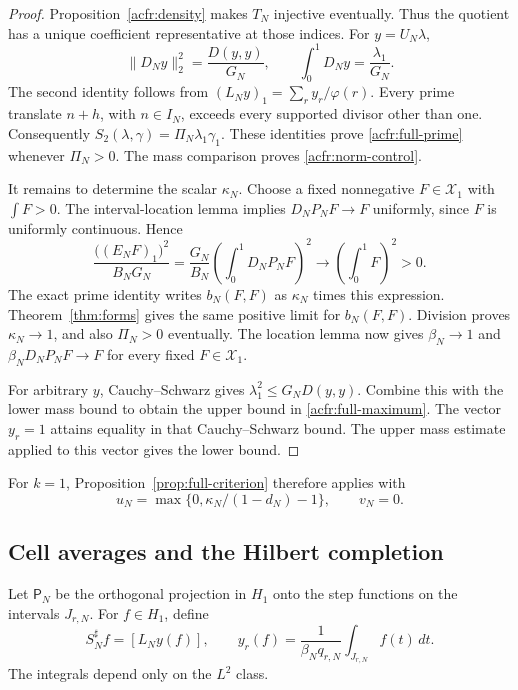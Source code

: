 \begin{proof}
Proposition~\ref{acfr:density} makes $T_N$ injective eventually.
Thus the quotient has a unique coefficient representative at those indices.
For $y=U_N\lambda$,
\[
 \|D_Ny\|_2^2=\frac{D(y,y)}{G_N},\qquad
 \int_0^1D_Ny=\frac{\lambda_1}{G_N}.
\]
The second identity follows from $(L_Ny)_1=\sum_ry_r/\varphi(r)$.
Every prime translate $n+h$, with $n\in I_N$, exceeds every supported divisor other than one.
Consequently $S_2(\lambda,\gamma)=\Pi_N\lambda_1\gamma_1$.
These identities prove \eqref{acfr:full-prime} whenever $\Pi_N>0$.
The mass comparison proves \eqref{acfr:norm-control}.

It remains to determine the scalar $\kappa_N$.
Choose a fixed nonnegative $F\in\mathcal X_1$ with $\int F>0$.
The interval-location lemma implies
$D_NP_NF\to F$ uniformly, since $F$ is uniformly continuous.
Hence
\[
 \frac{\bigl((E_NF)_1\bigr)^2}{B_NG_N}
       =\frac{G_N}{B_N}\left(\int_0^1D_NP_NF\right)^2
       \longrightarrow\left(\int_0^1F\right)^2>0.
\]
The exact prime identity writes $b_N(F,F)$ as $\kappa_N$ times this expression.
Theorem~\ref{thm:forms} gives the same positive limit for $b_N(F,F)$.
Division proves $\kappa_N\to1$, and also $\Pi_N>0$ eventually.
The location lemma now gives $\beta_N\to1$ and
$\beta_ND_NP_NF\to F$ for every fixed $F\in\mathcal X_1$.

For arbitrary $y$, Cauchy--Schwarz gives
$\lambda_1^2\leq G_ND(y,y)$.
Combine this with the lower mass bound to obtain the upper bound in
\eqref{acfr:full-maximum}.
The vector $y_r=1$ attains equality in that Cauchy--Schwarz bound.
The upper mass estimate applied to this vector gives the lower bound.
\end{proof}

For $k=1$, Proposition~\ref{prop:full-criterion} therefore applies with
\[
 u_N=\max\{0,\kappa_N/(1-d_N)-1\},\qquad v_N=0.
\]

\subsection{Cell averages and the Hilbert completion}

Let $\mathsf P_N$ be the orthogonal projection in $H_1$ onto the step functions
on the intervals $J_{r,N}$.
For $f\in H_1$, define
\begin{equation}\label{acfr:averages}
 S_N^\sharp f=[L_Ny(f)],\qquad
 y_r(f)=\frac1{\beta_Nq_{r,N}}\int_{J_{r,N}}f(t)\,dt.
\end{equation}
The integrals depend only on the $L^2$ class.

